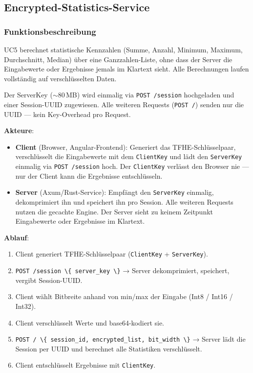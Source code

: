 \subsection{Encrypted-Statistics-Service}
\label{sub:encrypted_statistics_service}

\subsubsection{Funktionsbeschreibung}

UC5 berechnet statistische Kennzahlen (Summe, Anzahl, Minimum, Maximum, Durchschnitt, Median) über eine Ganzzahlen-Liste, ohne dass der Server die Eingabewerte oder Ergebnisse jemals im Klartext sieht. Alle Berechnungen laufen vollständig auf verschlüsselten Daten.

Der ServerKey ($\sim$80\,MB) wird einmalig via \verb|POST /session| hochgeladen und einer Session-UUID zugewiesen. Alle weiteren Requests (\verb|POST /|) senden nur die UUID — kein Key-Overhead pro Request.

\textbf{Akteure}:
\begin{itemize}
    \item \textbf{Client} (Browser, Angular-Frontend): Generiert das TFHE-Schlüsselpaar, verschlüsselt die Eingabewerte mit dem \verb|ClientKey| und lädt den \verb|ServerKey| einmalig via \verb|POST /session| hoch. Der \verb|ClientKey| verlässt den Browser nie — nur der Client kann die Ergebnisse entschlüsseln.
    \item \textbf{Server} (Axum/Rust-Service): Empfängt den \verb|ServerKey| einmalig, dekomprimiert ihn und speichert ihn pro Session. Alle weiteren Requests nutzen die gecachte Engine. Der Server sieht zu keinem Zeitpunkt Eingabewerte oder Ergebnisse im Klartext.
\end{itemize}

\textbf{Ablauf}:
\begin{enumerate}
    \item Client generiert TFHE-Schlüsselpaar (\verb|ClientKey| + \verb|ServerKey|).
    \item \verb|POST /session \{ server_key \}| → Server dekomprimiert, speichert, vergibt Session-UUID.
    \item Client wählt Bitbreite anhand von min/max der Eingabe (Int8 / Int16 / Int32).
    \item Client verschlüsselt Werte und base64-kodiert sie.
    \item \verb|POST / \{ session_id, encrypted_list, bit_width \}| → Server lädt die Session per UUID und berechnet alle Statistiken verschlüsselt.
    \item Client entschlüsselt Ergebnisse mit \verb|ClientKey|.
\end{enumerate}


